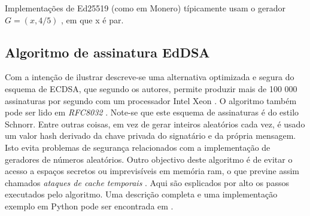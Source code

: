 \begin{enumerate}
Implementações de Ed25519 (como em Monero) típicamente usam o gerador $G = (x,4/5)$ \cite{Bernstein2012}, em que x é par.


\subsection{Algoritmo de assinatura EdDSA}
\label{EdDSA_section}

Com a intenção de ilustrar descreve-se uma alternativa optimizada e segura do esquema de ECDSA, que segundo os autores, permite produzir mais de 100 000 assinaturas por segundo com um processador Intel Xeon \cite{Bernstein2012}. O algoritmo também pode ser lido em {\em RFC8032} \cite{rfc8032}. Note-se que este esquema de assinaturas é do estilo Schnorr.  
Entre outras coisas, em vez de gerar inteiros aleatórios cada vez, é usado um valor hash derivado da chave privada do signatário e da própria mensagem. Isto evita problemas de segurança relacionados com a implementação de geradores de números aleatórios. Outro objectivo deste algoritmo é de evitar o acesso a espaços secretos ou imprevisíveis em memória ram, o que previne assim chamados {\em ataques de cache temporais} \cite{Bernstein2012}. Aqui são esplicados por alto os passos executados pelo algoritmo. Uma descrição completa e uma implementação exemplo em Python pode ser encontrada em \cite{rfc8032}.



\end{enumerate}
